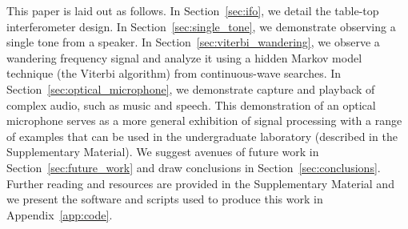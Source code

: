 \documentclass[paper-main.tex]{subfiles}
\begin{document}
This paper is laid out as follows. 
In Section~\ref{sec:ifo}, we detail the table-top interferometer design. 
In Section~\ref{sec:single_tone}, we demonstrate observing a single tone from a speaker. 
In Section~\ref{sec:viterbi_wandering}, we observe a wandering frequency signal and analyze it using a hidden Markov model technique (the Viterbi algorithm) from continuous-wave searches. 
In Section~\ref{sec:optical_microphone}, we demonstrate capture and playback of complex audio, such as music and speech.
This demonstration of an optical microphone serves as a more general exhibition of signal processing with a range of examples that can be used in the undergraduate laboratory (described in the Supplementary Material).
We suggest avenues of future work in Section~\ref{sec:future_work} and draw conclusions in Section~\ref{sec:conclusions}. 
Further reading and resources are provided in the Supplementary Material and we present the software and scripts used to produce this work in Appendix~\ref{app:code}.
\end{document}
